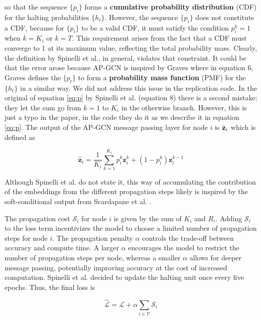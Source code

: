 \documentclass{gdl}
\begin{document}
\noindent so that the sequence $\{p_i\}$ forms a \textbf{cumulative probability distribution} (CDF) for the halting probabilities $\{h_i\}$. However, the sequence $\{p_i\}$ does not constitute a CDF, because for $\{p_i\}$ to be a valid CDF, it must satisfy the condition $p_i^k = 1$ when $k = K_i$ or $k = T$. This requirement arises from the fact that a CDF must converge to 1 at its maximum value, reflecting the total probability mass. Clearly, the definition by Spinelli et al., in general, violates that constraint. It could be that the error arose because AP-GCN is inspired by Graves \cite{graves2017} where in equation 6, Graves defines the $\{p_t\}$ to form a \textbf{probability mass function} (PMF) for the $\{h_t\}$ in a similar way. We did not address this issue in the replication code. In the original of equation \ref{eq:p} by Spinelli et al. (equation 8) there is a second mistake: they let the sum go from $k=1$ to $K_i$ in the otherwise branch. However, this is just a typo in the paper, in the code they do it as we describe it in equation \ref{eq:p}.
The output of the AP-GCN message passing layer for node $i$ is $\hat{\bf{z}}_i$ which is defined as

$$ 
\hat{\mathbf{z}}_i = \frac{1}{K_i} \sum_{k=1}^{K_i} p_i^k \mathbf{z}^k_i + (1-p^k_i) \mathbf{z}_i^{k-1} 
$$

\noindent Although Spinelli et al. do not state it, this way of accumulating the contribution of the embeddings from the different propagation steps likely is inspired by the soft-conditional output from Scardapane et al. \cite{scardapane2020}.

 The propagation cost $\mathcal{S}_i$ for node $i$ is given by the sum of $K_i$ and $R_i$. Adding $\mathcal{S}_i$ to the loss term incentivizes the model to choose a limited number of propagation steps for node $i$. The propagation penalty $\alpha$ controls the trade-off between accuracy and compute time. A larger $\alpha$ encourages the model to restrict the number of propagation steps per node, whereas a smaller $\alpha$ allows for deeper message passing, potentially improving accuracy at the cost of increased computation. Spinelli et al. decided to update the halting unit once every five epochs. Thus, the final loss is

$$ \mathcal{\hat{L}} = \mathcal{L} + \alpha \sum_{i\in \mathcal{V}} \mathcal{S}_i $$
\end{document}
